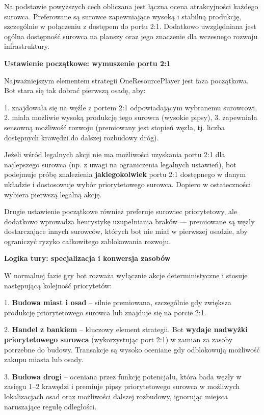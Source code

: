 \documentclass[polish,inz,longabstract]{iithesis}
\begin{document}
Na podstawie powyższych cech obliczana jest łączna ocena atrakcyjności każdego surowca. Preferowane są surowce zapewniające wysoką i stabilną produkcję, szczególnie w połączeniu z dostępem do portu 2:1. Dodatkowo uwzględniana jest ogólna dostępność surowca na planszy oraz jego znaczenie dla wczesnego rozwoju infrastruktury.

\textbf{Ustawienie początkowe: wymuszenie portu 2:1}

Najważniejszym elementem strategii OneResourcePlayer jest faza początkowa. Bot stara się tak dobrać pierwszą osadę, aby:

1. znajdowała się na węźle z portem 2:1 odpowiadającym wybranemu surowcowi,
2. miała możliwie wysoką produkcję tego surowca (wysokie pipsy),
3. zapewniała sensowną możliwość rozwoju (premiowany jest stopień węzła, tj. liczba dostępnych krawędzi do dalszej rozbudowy dróg).

Jeżeli wśród legalnych akcji nie ma możliwości uzyskania portu 2:1 dla najlepszego surowca (np. z uwagi na ograniczenia legalnych ustawień), bot podejmuje próbę znalezienia \textbf{jakiegokolwiek} portu 2:1 dostępnego w danym układzie i dostosowuje wybór priorytetowego surowca. Dopiero w ostateczności wybiera pierwszą legalną akcję.

Drugie ustawienie początkowe również preferuje surowiec priorytetowy, ale dodatkowo wprowadza heurystykę uzupełniania braków — premiowane są węzły dostarczające innych surowców, których bot nie miał w pierwszej osadzie, aby ograniczyć ryzyko całkowitego zablokowania rozwoju.

\medskip
\textbf{Logika tury: specjalizacja i konwersja zasobów}

W normalnej fazie gry bot rozważa wyłącznie akcje deterministyczne i stosuje następującą kolejność priorytetów:

1. \textbf{Budowa miast i osad} – silnie premiowana, szczególnie gdy zwiększa produkcję priorytetowego surowca lub znajduje się na porcie 2:1.

2. \textbf{Handel z bankiem} – kluczowy element strategii. Bot \textbf{wydaje nadwyżki priorytetowego surowca} (wykorzystując port 2:1) w zamian za zasoby potrzebne do budowy. Transakcje są wysoko oceniane gdy odblokowują możliwość zakupu miasta lub osady.

3. \textbf{Budowa drogi} – oceniana przez funkcję potencjału, która bada węzły w zasięgu 1–2 krawędzi i premiuje pipsy priorytetowego surowca w możliwych lokalizacjach osad oraz możliwości dalszej rozbudowy, ignorując miejsca naruszające regułę odległości.
\end{document}
